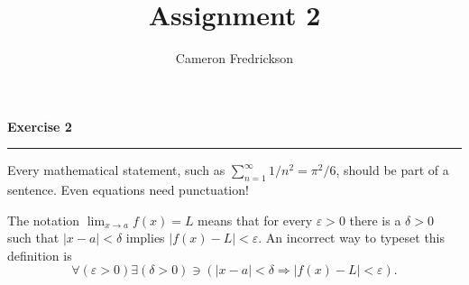 \documentclass{article}
\title{Assignment 2}
\author{Cameron Fredrickson}
\date{}
\begin{document}
\maketitle

\noindent \textbf{Exercise 2}

\noindent \rule{\textwidth}{.1mm}

Every mathematical statement, such as $ \sum_{n=1}^\infty 1/n^2 = \pi^2/6$, should be part of a sentence. Even equations need punctuation!

The notation $ \lim_{x \to a} f(x) = L$ means that for every $ \varepsilon > 0$ there is a $ \delta > 0$ such that $|x-a| < \delta$ implies $|f(x)-L| < \varepsilon$. An incorrect way to typeset this definition is \begin{equation*}
\forall \left( \varepsilon > 0 \right) \exists \left( \delta > 0 \right) \ni \left( |x-a| < \delta \Longrightarrow |f(x)-L| < \varepsilon \right).
\end{equation*}
\end{document}
